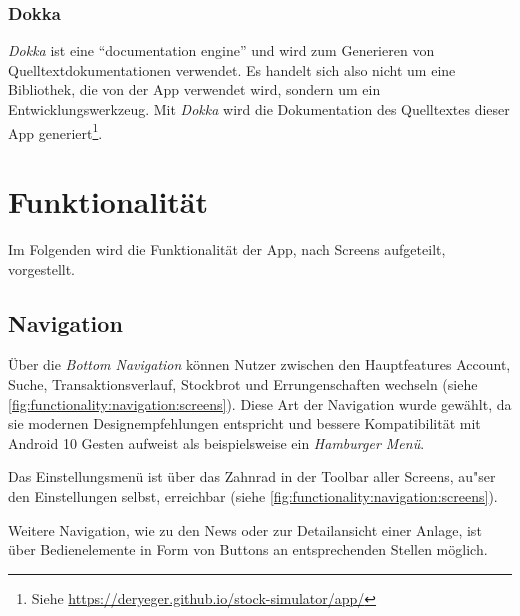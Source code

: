 \documentclass[a4paper]{article}
\begin{document}
\subsubsection{Dokka}
\label{subsubsec:technologies:bibs:dokka}
\textit{Dokka} ist eine "`documentation engine"' und wird zum Generieren von Quelltextdokumentationen verwendet.
Es handelt sich also nicht um eine Bibliothek, die von der App verwendet wird, sondern um ein Entwicklungswerkzeug.
Mit \textit{Dokka}  wird die Dokumentation des Quelltextes dieser App generiert\footnote{Siehe \url{https://deryeger.github.io/stock-simulator/app/}}.


\section{Funktionalität}
\label{sec:functionality}
Im Folgenden wird die Funktionalität der App, nach Screens aufgeteilt, vorgestellt.


\subsection{Navigation}
\label{subsec:functionality:navigation}
Über die \textit{Bottom Navigation} \autocite{bottom_navigation} können Nutzer zwischen den Hauptfeatures Account, Suche, Transaktionsverlauf, Stockbrot und Errungenschaften wechseln (siehe \autoref{fig:functionality:navigation:screens}).
Diese Art der Navigation wurde gewählt, da sie modernen Designempfehlungen entspricht und bessere Kompatibilität mit Android 10 Gesten aufweist als beispielsweise ein \textit{Hamburger Menü}.

Das Einstellungsmenü ist über das Zahnrad in der Toolbar aller Screens, au"ser den Einstellungen selbst, erreichbar (siehe \autoref{fig:functionality:navigation:screens}).

Weitere Navigation, wie zu den News oder zur Detailansicht einer Anlage, ist über Bedienelemente in Form von Buttons an entsprechenden Stellen möglich.
\end{document}
